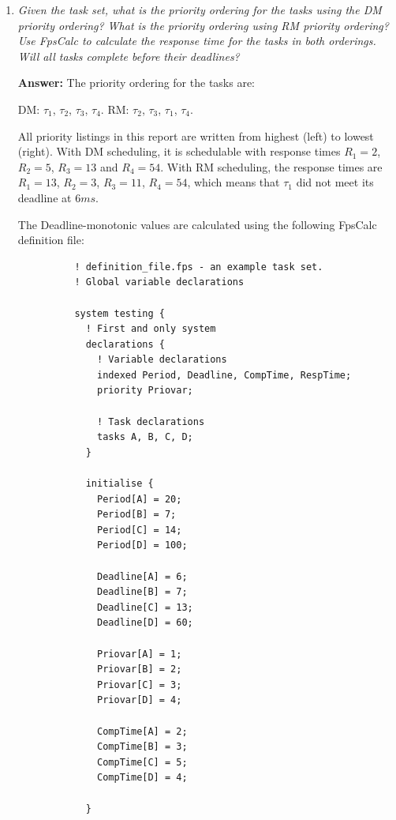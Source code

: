 \documentclass[a4paper,10pt]{article}
\newcommand{\answer}{\textbf{Answer: }}
\begin{document}
\begin{enumerate}
	\item \emph{Given the task set, what is the priority ordering for the tasks using the DM priority ordering? What is the priority ordering using RM priority ordering? Use FpsCalc to calculate the response time for the tasks in both orderings. Will all tasks complete before their deadlines?}
	
	\answer The priority ordering for the tasks are:
	
	DM: $\tau_1$, $\tau_2$, $\tau_3$, $\tau_4$.
	RM: $\tau_2$, $\tau_3$, $\tau_1$, $\tau_4$.
	
	All priority listings in this report are written from highest (left) to lowest (right). With DM scheduling, it is schedulable with response times $R_1 = 2$, $R_2 = 5$, $R_3 = 13$ and $R_4 = 54$. With RM scheduling, the response times are $R_1 = 13$, $R_2 = 3$, $R_3 = 11$, $R_4 = 54$, which means that $\tau_1$ did not meet its deadline at $6ms$.
	
	The Deadline-monotonic values are calculated using the following FpsCalc definition file:

        \begin{lstlisting}
          ! definition_file.fps - an example task set.
          ! Global variable declarations
          
          system testing {
            ! First and only system
            declarations {		
              ! Variable declarations
              indexed Period, Deadline, CompTime, RespTime;
              priority Priovar;	
              
              ! Task declarations
              tasks A, B, C, D;
            }
            
            initialise {
              Period[A] = 20;
              Period[B] = 7;
              Period[C] = 14;
              Period[D] = 100;
              
              Deadline[A] = 6;
              Deadline[B] = 7;
              Deadline[C] = 13;
              Deadline[D] = 60;
              
              Priovar[A] = 1;
              Priovar[B] = 2;
              Priovar[C] = 3;
              Priovar[D] = 4;
              
              CompTime[A] = 2;
              CompTime[B] = 3;
              CompTime[C] = 5;
              CompTime[D] = 4;
              
            }
            

\end{lstlisting}
\end{enumerate}
\end{document}
